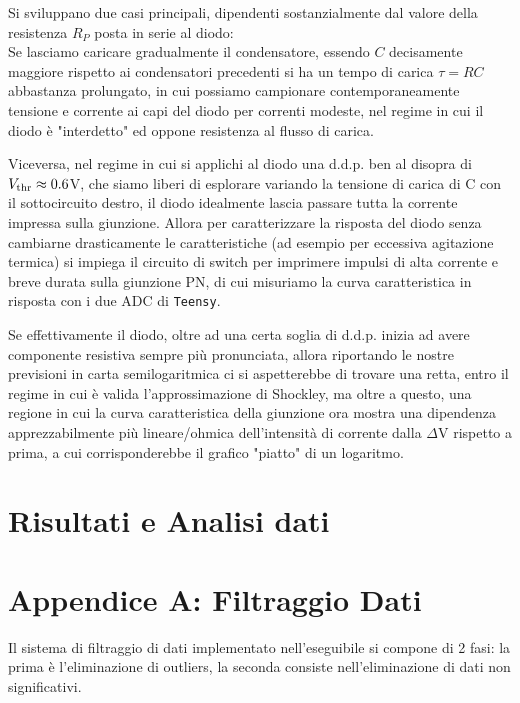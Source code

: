 \documentclass{article}[a4paper, oneside, 11pt]
\begin{document}
Si sviluppano due casi principali, dipendenti sostanzialmente dal valore della
resistenza $R_P$ posta in serie al diodo:\\

Se lasciamo caricare gradualmente il condensatore, essendo $C$ decisamente
maggiore rispetto ai condensatori precedenti si ha un tempo di carica
$\tau = RC$ abbastanza prolungato, in cui possiamo campionare contemporaneamente
tensione e corrente ai capi del diodo per correnti modeste, nel regime in cui
il diodo è "interdetto" ed oppone resistenza al flusso di carica.

Viceversa, nel regime in cui si applichi al diodo una d.d.p. ben al disopra di
$V_{\rm thr} \approx 0.6 $V, che siamo liberi di esplorare variando la tensione
di carica di C con il sottocircuito destro, il diodo idealmente lascia passare
tutta la corrente impressa sulla giunzione. Allora per caratterizzare la
risposta del diodo senza cambiarne drasticamente le caratteristiche (ad esempio
per eccessiva agitazione termica) si impiega il circuito di switch per
imprimere impulsi di alta corrente e breve durata sulla giunzione PN, di cui
misuriamo la curva caratteristica in risposta con i due ADC di \verb+Teensy+.

Se effettivamente il diodo, oltre ad una certa soglia di d.d.p. inizia ad avere
componente resistiva sempre più pronunciata, allora riportando le nostre
previsioni in carta semilogaritmica ci si aspetterebbe di trovare una retta,
entro il regime in cui è valida l'approssimazione di Shockley, ma oltre a
questo, una regione in cui la curva caratteristica della giunzione ora mostra
una dipendenza apprezzabilmente più lineare/ohmica dell'intensità di corrente
dalla $\Delta$V rispetto a prima, a cui corrisponderebbe il grafico "piatto"
di un logaritmo.  
\section{Risultati e Analisi dati}
\section{Appendice A: Filtraggio Dati}
Il sistema di filtraggio di dati implementato nell'eseguibile si compone di 2
fasi: la prima è l’eliminazione di outliers, la seconda consiste
nell'eliminazione di dati non significativi.
\end{document}

